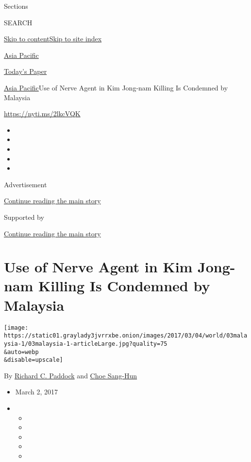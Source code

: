 Sections

SEARCH

\protect\hyperlink{site-content}{Skip to
content}\protect\hyperlink{site-index}{Skip to site index}

\href{https://www.nytimes3xbfgragh.onion/section/world/asia}{Asia
Pacific}

\href{https://myaccount.nytimes3xbfgragh.onion/auth/login?response_type=cookie\&client_id=vi}{}

\href{https://www.nytimes3xbfgragh.onion/section/todayspaper}{Today's
Paper}

\href{/section/world/asia}{Asia Pacific}\textbar{}Use of Nerve Agent in
Kim Jong-nam Killing Is Condemned by Malaysia

\url{https://nyti.ms/2lkcVQK}

\begin{itemize}
\item
\item
\item
\item
\item
\end{itemize}

Advertisement

\protect\hyperlink{after-top}{Continue reading the main story}

Supported by

\protect\hyperlink{after-sponsor}{Continue reading the main story}

\hypertarget{use-of-nerve-agent-in-kim-jong-nam-killing-is-condemned-by-malaysia}{%
\section{Use of Nerve Agent in Kim Jong-nam Killing Is Condemned by
Malaysia}\label{use-of-nerve-agent-in-kim-jong-nam-killing-is-condemned-by-malaysia}}

\texttt{[image: https://static01.graylady3jvrrxbe.onion/images/2017/03/04/world/03malaysia-1/03malaysia-1-articleLarge.jpg?quality=75\\\&auto=webp\\\&disable=upscale]}

By
\href{https://www.nytimes3xbfgragh.onion/by/richard-c-paddock}{Richard
C. Paddock} and
\href{http://www.nytimes3xbfgragh.onion/by/choe-sang-hun}{Choe Sang-Hun}

\begin{itemize}
\item
  March 2, 2017
\item
  \begin{itemize}
  \item
  \item
  \item
  \item
  \item
  \end{itemize}
\end{itemize}


